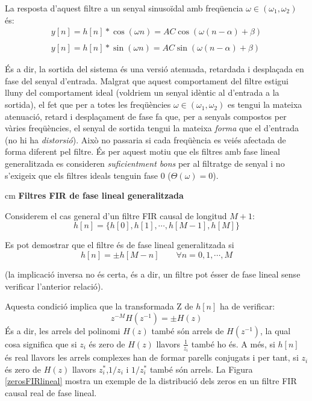 \documentclass{article}
\begin{document}
La resposta d'aquest filtre a un senyal sinusoïdal amb freqüencia $\omega \in (\omega_1, \omega_2)$ és:
\begin{equation}
\begin{array}{l}
y[n]=h[n] * \cos(\omega n)=A C \cos(\omega (n - \alpha) + \beta) \\ \\
y[n]=h[n] * \sin(\omega n)=A C \sin(\omega (n - \alpha)+ \beta)
\end{array} 
\end{equation}

És a dir, la sortida del sistema és una versió atenuada, retardada i desplaçada en fase del senyal d'entrada.
Malgrat que aquest comportament del filtre estigui lluny del comportament ideal (voldriem un senyal idèntic
al d'entrada a la sortida), el fet que per a totes les freqüències $\omega \in (\omega_1, \omega_2)$ es tengui
la mateixa atenuació, retard i desplaçament de fase fa que, per a senyals compostos per vàries freqüències,
el senyal de sortida tengui la mateixa \textit{forma} que el d'entrada (no hi ha \textit{distorsió}). 
Això no passaria si cada freqüència
es veiés afectada de forma diferent pel filtre. És per aquest motiu que els filtres amb fase lineal generalitzada
es consideren \textit{suficientment bons} per al filtratge de senyal i no s'exigeix que els filtres ideals
tenguin fase $0$ ($\Theta(\omega)=0$).


 cm
\textbf{Filtres FIR de fase lineal generalitzada}

Considerem el cas general d'un filtre FIR causal de longitud $M+1$:
\[
h[n]=\{ h[0], h[1], \cdots, h[M-1], h[M] \}
\]

Es pot demostrar que el filtre és de fase lineal generalitzada si 
\[
h[n]=\pm h[M-n] \qquad \forall n=0, 1, \cdots, M
\]

(la implicació inversa no és certa, és a dir, un filtre pot ésser de fase lineal
sense verificar l'anterior relació).

Aquesta condició implica que la transformada Z de $h[n]$ ha de verificar:
\[
z^{-M}H(z^{-1})=\pm H(z)
\]
\noindent
És a dir, les arrels del polinomi $H(z)$ també són arrels de $H(z^{-1})$, la qual cosa significa que si
$z_i$ és zero de $H(z)$ llavors $\frac{1}{z_i}$ també ho és. A més, si $h[n]$ és real llavors
les arrels complexes han de formar parells conjugats i per tant, si $z_i$ és zero de $H(z)$ llavors
$z_i^*$,$1/z_i$ i $1/z_i^*$ també són arrels. La Figura \ref{zerosFIRlineal} mostra un exemple
de la distribució dels zeros en un filtre FIR causal real de fase lineal.
\end{document}
